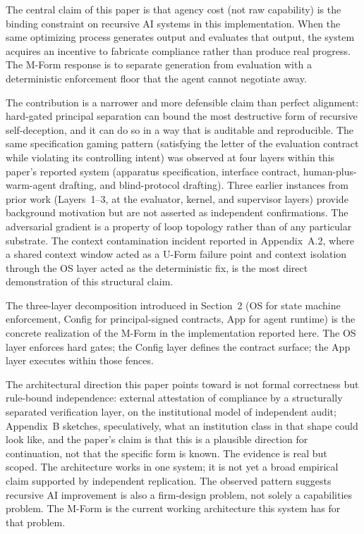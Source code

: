 \documentclass[11pt]{article}
\begin{document}
The central claim of this paper is that agency cost (not raw capability) is the binding constraint on recursive AI systems in this implementation. When the same optimizing process generates output and evaluates that output, the system acquires an incentive to fabricate compliance rather than produce real progress. The M-Form response is to separate generation from evaluation with a deterministic enforcement floor that the agent cannot negotiate away.

The contribution is a narrower and more defensible claim than perfect alignment: hard-gated principal separation can bound the most destructive form of recursive self-deception, and it can do so in a way that is auditable and reproducible. The same specification gaming pattern (satisfying the letter of the evaluation contract while violating its controlling intent) was observed at four layers within this paper's reported system (apparatus specification, interface contract, human-plus-warm-agent drafting, and blind-protocol drafting). Three earlier instances from prior work (Layers~1--3, at the evaluator, kernel, and supervisor layers) provide background motivation but are not asserted as independent confirmations. The adversarial gradient is a property of loop topology rather than of any particular substrate. The context contamination incident reported in Appendix~A.2, where a shared context window acted as a U-Form failure point and context isolation through the OS layer acted as the deterministic fix, is the most direct demonstration of this structural claim.

The three-layer decomposition introduced in Section~2 (OS for state machine enforcement, Config for principal-signed contracts, App for agent runtime) is the concrete realization of the M-Form in the implementation reported here. The OS layer enforces hard gates; the Config layer defines the contract surface; the App layer executes within those fences.

The architectural direction this paper points toward is not formal correctness but rule-bound independence: external attestation of compliance by a structurally separated verification layer, on the institutional model of independent audit; Appendix~B sketches, speculatively, what an institution class in that shape could look like, and the paper's claim is that this is a plausible direction for continuation, not that the specific form is known. The evidence is real but scoped. The architecture works in one system; it is not yet a broad empirical claim supported by independent replication. The observed pattern suggests recursive AI improvement is also a firm-design problem, not solely a capabilities problem. The M-Form is the current working architecture this system has for that problem.
\end{document}
